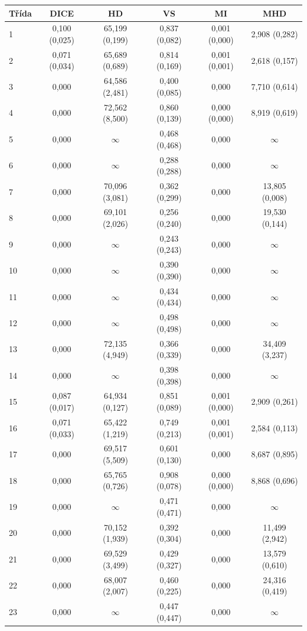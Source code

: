 \begin{tabular}{l c c c c c}
 \hline
Třída & DICE & HD & VS & MI & MHD \\ \hline
1 & 0,100 (0,025) & 65,199 (0,199) & 0,837 (0,082) & 0,001 (0,000) & 2,908 (0,282) \\
2 & 0,071 (0,034) & 65,689 (0,689) & 0,814 (0,169) & 0,001 (0,001) & 2,618 (0,157) \\
3 & 0,000 & 64,586 (2,481) & 0,400 (0,085) & 0,000 & 7,710 (0,614) \\
4 & 0,000 & 72,562 (8,500) & 0,860 (0,139) & 0,000 (0,000) & 8,919 (0,619) \\
5 & 0,000 & $\infty$ & 0,468 (0,468) & 0,000 & $\infty$ \\
6 & 0,000 & $\infty$ & 0,288 (0,288) & 0,000 & $\infty$ \\
7 & 0,000 & 70,096 (3,081) & 0,362 (0,299) & 0,000 & 13,805 (0,008) \\
8 & 0,000 & 69,101 (2,026) & 0,256 (0,240) & 0,000 & 19,530 (0,144) \\
9 & 0,000 & $\infty$ & 0,243 (0,243) & 0,000 & $\infty$ \\
10 & 0,000 & $\infty$ & 0,390 (0,390) & 0,000 & $\infty$ \\
11 & 0,000 & $\infty$ & 0,434 (0,434) & 0,000 & $\infty$ \\
12 & 0,000 & $\infty$ & 0,498 (0,498) & 0,000 & $\infty$ \\
13 & 0,000 & 72,135 (4,949) & 0,366 (0,339) & 0,000 & 34,409 (3,237) \\
14 & 0,000 & $\infty$ & 0,398 (0,398) & 0,000 & $\infty$ \\
15 & 0,087 (0,017) & 64,934 (0,127) & 0,851 (0,089) & 0,001 (0,000) & 2,909 (0,261) \\
16 & 0,071 (0,033) & 65,422 (1,219) & 0,749 (0,213) & 0,001 (0,001) & 2,584 (0,113) \\
17 & 0,000 & 69,517 (5,509) & 0,601 (0,130) & 0,000 & 8,687 (0,895) \\
18 & 0,000 & 65,765 (0,726) & 0,908 (0,078) & 0,000 (0,000) & 8,868 (0,696) \\
19 & 0,000 & $\infty$ & 0,471 (0,471) & 0,000 & $\infty$ \\
20 & 0,000 & 70,152 (1,939) & 0,392 (0,304) & 0,000 & 11,499 (2,942) \\
21 & 0,000 & 69,529 (3,499) & 0,429 (0,327) & 0,000 & 13,579 (0,610) \\
22 & 0,000 & 68,007 (2,007) & 0,460 (0,225) & 0,000 & 24,316 (0,419) \\
23 & 0,000 & $\infty$ & 0,447 (0,447) & 0,000 & $\infty$ \\

\end{tabular}
